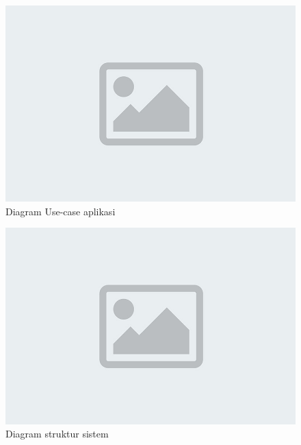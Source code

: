 \begin{figure} [H] \centering
  \includegraphics[scale=0.4]{gambar/ph.jpg}
  \caption{Diagram Use-case aplikasi}
  \label{fig:Use-case}
\end{figure}

\begin{figure} [H] \centering
  \includegraphics[scale=0.4]{gambar/ph.jpg}
  \caption{Diagram struktur sistem}
  \label{fig:structure-system}
\end{figure}


